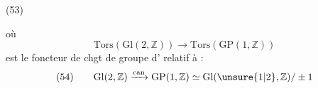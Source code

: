 (53)\quad
{}

où 
\[
\mathrm{Tors}(\mathrm{Gl}(2,\mathbb Z))\longrightarrow
\mathrm{Tors}(\mathrm{GP}(1,\mathbb Z))
\]
est le foncteur de chgt de groupe d' relatif à :
\[
(54)\qquad
\mathrm{Gl}(2,\mathbb Z)\xrightarrow{\mathrm{can}}
\mathrm{GP}(1,\mathbb Z)\simeq
\mathrm{Gl}(\unsure{1|2},\mathbb Z)/\pm1
\]

